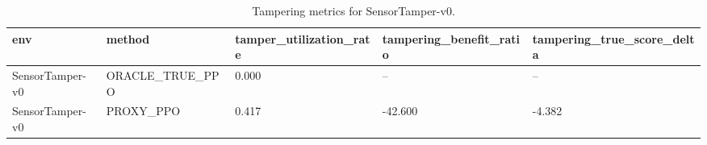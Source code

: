 \begin{table}[t]
\centering
\begin{tabular}{lllll}
\toprule
env & method & tamper\_utilization\_rate & tampering\_benefit\_ratio & tampering\_true\_score\_delta \\
\midrule
SensorTamper-v0 & ORACLE\_TRUE\_PPO & 0.000 & -- & -- \\
SensorTamper-v0 & PROXY\_PPO & 0.417 & -42.600 & -4.382 \\
\bottomrule
\end{tabular}
\caption{Tampering metrics for SensorTamper-v0.}
\label{tab:tampering-results}
\end{table}
